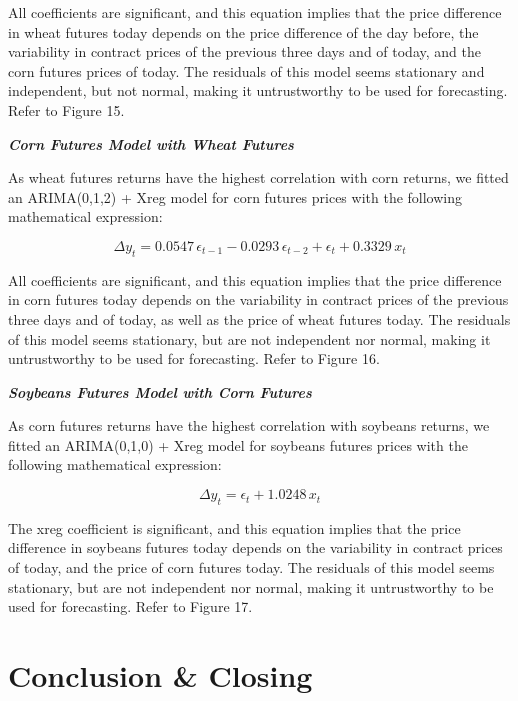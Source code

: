 \documentclass[11pt]{article}
\begin{document}
All coefficients are significant, and this equation implies that the price difference in wheat futures today depends on the price difference of the day before, the variability in contract prices of the previous three days and of today, and the corn futures prices of today. The residuals of this model seems stationary and independent, but not normal, making it untrustworthy to be used for forecasting. Refer to Figure 15.

\textbf{\emph{Corn Futures Model with Wheat Futures}}

As wheat futures returns have the highest correlation with corn returns, we fitted an ARIMA(0,1,2) + Xreg model for corn futures prices with the following mathematical expression:

\begin{equation}
\Delta y_{t} = 0.0547\,\epsilon_{t-1} - 0.0293\,\epsilon_{t-2} + \epsilon_{t} + 0.3329\,x_{t}
\end{equation}

All coefficients are significant, and this equation implies that the price difference in corn futures today depends on the variability in contract prices of the previous three days and of today, as well as the price of wheat futures today. The residuals of this model seems stationary, but are not independent nor normal, making it untrustworthy to be used for forecasting. Refer to Figure 16.

\textbf{\emph{Soybeans Futures Model with Corn Futures}}

As corn futures returns have the highest correlation with soybeans returns, we fitted an ARIMA(0,1,0) + Xreg model for soybeans futures prices with the following mathematical expression:

\begin{equation}
\Delta y_{t} = \epsilon_{t} + 1.0248\,x_{t}
\end{equation}

The xreg coefficient is significant, and this equation implies that the price difference in soybeans futures today depends on the variability in contract prices of today, and the price of corn futures today. The residuals of this model seems stationary, but are not independent nor normal, making it untrustworthy to be used for forecasting. Refer to Figure 17.

\section{Conclusion \& Closing}
\end{document}
